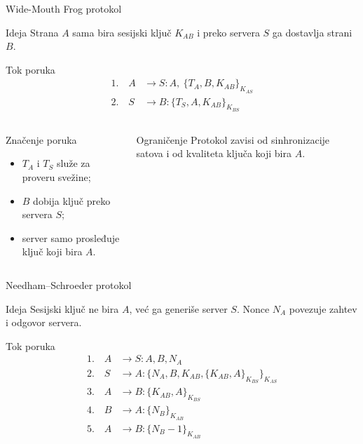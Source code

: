 \documentclass[aspectratio=1610]{beamer}
\newcommand{\enc}[2]{\{#1\}_{#2}}
\begin{document}
\begin{frame}[t]{Wide-Mouth Frog protokol}
\small
\begin{block}{Ideja}
Strana $A$ sama bira sesijski ključ $K_{AB}$ i preko servera $S$ ga dostavlja strani $B$.
\end{block}

\begin{block}{Tok poruka}
\[
\begin{aligned}
1.\quad A &\rightarrow S : A,\ \enc{T_A, B, K_{AB}}{K_{AS}} \\
2.\quad S &\rightarrow B : \enc{T_S, A, K_{AB}}{K_{BS}}
\end{aligned}
\]
\end{block}

\begin{columns}[T,onlytextwidth]
\begin{block}{Značenje poruka}
\begin{itemize}
    \item $T_A$ i $T_S$ služe za proveru svežine;
    \item $B$ dobija ključ preko servera $S$;
    \item server samo prosleđuje ključ koji bira $A$.
\end{itemize}
\end{block}

\begin{alertblock}{Ograničenje}
Protokol zavisi od sinhronizacije satova i od kvaliteta ključa koji bira $A$.
\end{alertblock}
\end{columns}
\end{frame}

\begin{frame}[t]{Needham--Schroeder protokol}
\scriptsize
\begin{block}{Ideja}
Sesijski ključ ne bira $A$, već ga generiše server $S$. Nonce $N_A$ povezuje zahtev i odgovor servera.
\end{block}

\begin{block}{Tok poruka}
\[
\begin{aligned}
1.\quad A &\rightarrow S : A, B, N_A \\
2.\quad S &\rightarrow A : \enc{N_A, B, K_{AB}, \enc{K_{AB}, A}{K_{BS}}}{K_{AS}} \\
3.\quad A &\rightarrow B : \enc{K_{AB}, A}{K_{BS}} \\
4.\quad B &\rightarrow A : \enc{N_B}{K_{AB}} \\
5.\quad A &\rightarrow B : \enc{N_B - 1}{K_{AB}}
\end{aligned}
\]
\end{block}

\end{frame}
\end{document}
